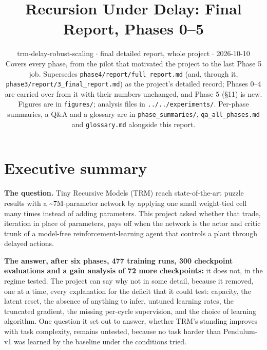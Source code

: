 \documentclass[11pt]{article}
\title{Recursion Under Delay: Final Report, Phases 0--5}
\author{}
\date{trm-delay-robust-scaling $\cdot$ final detailed report, whole project $\cdot$ 2026-10-10\\[2pt]Covers every phase, from the pilot that motivated the project to the last Phase 5 job. Supersedes \texttt{phase4/\allowbreak{}report/\allowbreak{}full\_\allowbreak{}report.\allowbreak{}md} (and, through it, \texttt{phase3/\allowbreak{}report/\allowbreak{}3\_\allowbreak{}final\_\allowbreak{}report.\allowbreak{}md}) as the project's detailed record; Phases 0--4 are carried over from it with their numbers unchanged, and Phase 5 (\S{}11) is new. Figures are in \texttt{figures/}; analysis files in \texttt{.\allowbreak{}.\allowbreak{}/\allowbreak{}.\allowbreak{}.\allowbreak{}/\allowbreak{}experiments/\allowbreak{}}. Per-phase summaries, a Q\&A and a glossary are in \texttt{phase\_\allowbreak{}summaries/\allowbreak{}}, \texttt{qa\_\allowbreak{}all\_\allowbreak{}phases.\allowbreak{}md} and \texttt{glossary.md} alongside this report.}
\begin{document}
\maketitle
\tableofcontents
\clearpage



\section*{Executive summary}



\textbf{The question.} Tiny Recursive Models (TRM) reach state-of-the-art puzzle results with a \textasciitilde{}7M-parameter network by applying one small weight-tied cell many times instead of adding parameters. This project asked whether that trade, iteration in place of parameters, pays off when the network is the actor and critic trunk of a model-free reinforcement-learning agent that controls a plant through delayed actions.



\textbf{The answer, after six phases, 477 training runs, 300 checkpoint evaluations and a gain analysis of 72 more checkpoints:} it does not, in the regime tested. The project can say why not in some detail, because it removed, one at a time, every explanation for the deficit that it could test: capacity, the latent reset, the absence of anything to infer, untuned learning rates, the truncated gradient, the missing per-cycle supervision, and the choice of learning algorithm. One question it set out to answer, whether TRM's standing improves with task complexity, remains untested, because no task harder than Pendulum-v1 was learned by the baseline under the conditions tried.
\end{document}
